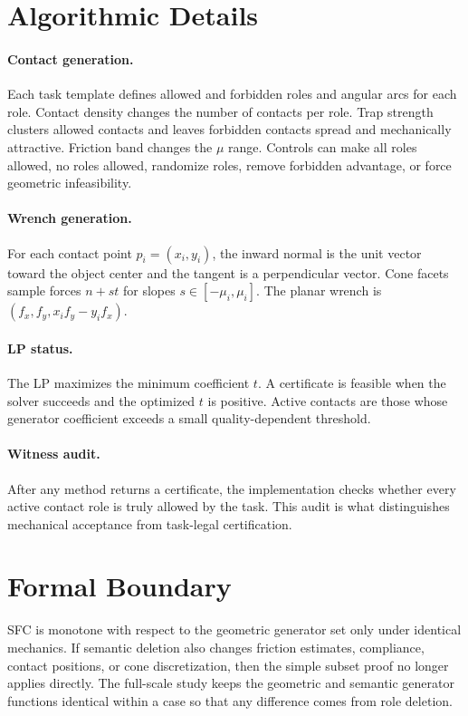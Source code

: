 \documentclass{article}
\begin{document}
\section{Algorithmic Details}

\paragraph{Contact generation.}
Each task template defines allowed and forbidden roles and angular arcs for each role. Contact density changes the number of contacts per role. Trap strength clusters allowed contacts and leaves forbidden contacts spread and mechanically attractive. Friction band changes the \(\mu\) range. Controls can make all roles allowed, no roles allowed, randomize roles, remove forbidden advantage, or force geometric infeasibility.

\paragraph{Wrench generation.}
For each contact point \(p_i=(x_i,y_i)\), the inward normal is the unit vector toward the object center and the tangent is a perpendicular vector. Cone facets sample forces \(n+s t\) for slopes \(s\in[-\mu_i,\mu_i]\). The planar wrench is \((f_x,f_y,x_i f_y-y_i f_x)\).

\paragraph{LP status.}
The LP maximizes the minimum coefficient \(t\). A certificate is feasible when the solver succeeds and the optimized \(t\) is positive. Active contacts are those whose generator coefficient exceeds a small quality-dependent threshold.

\paragraph{Witness audit.}
After any method returns a certificate, the implementation checks whether every active contact role is truly allowed by the task. This audit is what distinguishes mechanical acceptance from task-legal certification.

\section{Formal Boundary}

SFC is monotone with respect to the geometric generator set only under identical mechanics. If semantic deletion also changes friction estimates, compliance, contact positions, or cone discretization, then the simple subset proof no longer applies directly. The full-scale study keeps the geometric and semantic generator functions identical within a case so that any difference comes from role deletion.
\end{document}
